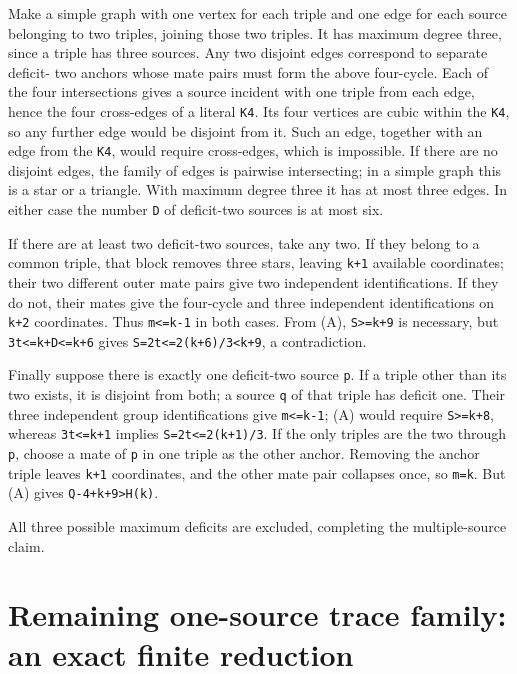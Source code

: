 \documentclass[11pt,letterpaper]{article}
\begin{document}
Make a simple graph with one vertex for each triple and one edge for
each source belonging to two triples, joining those two triples. It has
maximum degree three, since a triple has three sources. Any two disjoint
edges correspond to separate deficit- two anchors whose mate pairs must
form the above four-cycle. Each of the four intersections gives a source
incident with one triple from each edge, hence the four cross-edges of a
literal \texttt{K4}. Its four vertices are cubic within the \texttt{K4},
so any further edge would be disjoint from it. Such an edge, together
with an edge from the \texttt{K4}, would require cross-edges, which is
impossible. If there are no disjoint edges, the family of edges is
pairwise intersecting; in a simple graph this is a star or a triangle.
With maximum degree three it has at most three edges. In either case the
number \texttt{D} of deficit-two sources is at most six.

If there are at least two deficit-two sources, take any two. If they
belong to a common triple, that block removes three stars, leaving
\texttt{k+1} available coordinates; their two different outer mate pairs
give two independent identifications. If they do not, their mates give
the four-cycle and three independent identifications on \texttt{k+2}
coordinates. Thus \texttt{m\textless{}=k-1} in both cases. From (A),
\texttt{S\textgreater{}=k+9} is necessary, but
\texttt{3t\textless{}=k+D\textless{}=k+6} gives
\texttt{S=2t\textless{}=2(k+6)/3\textless{}k+9}, a contradiction.

Finally suppose there is exactly one deficit-two source \texttt{p}. If a
triple other than its two exists, it is disjoint from both; a source
\texttt{q} of that triple has deficit one. Their three independent group
identifications give \texttt{m\textless{}=k-1}; (A) would require
\texttt{S\textgreater{}=k+8}, whereas \texttt{3t\textless{}=k+1} implies
\texttt{S=2t\textless{}=2(k+1)/3}. If the only triples are the two
through \texttt{p}, choose a mate of \texttt{p} in one triple as the
other anchor. Removing the anchor triple leaves \texttt{k+1}
coordinates, and the other mate pair collapses once, so \texttt{m=k}.
But (A) gives \texttt{Q-4+k+9\textgreater{}H(k)}.

All three possible maximum deficits are excluded, completing the
multiple-source claim.

\section{Remaining one-source trace family: an exact finite
reduction}\label{6-remaining-one-source-trace-family-an-exact-finite-reduction}
\end{document}
